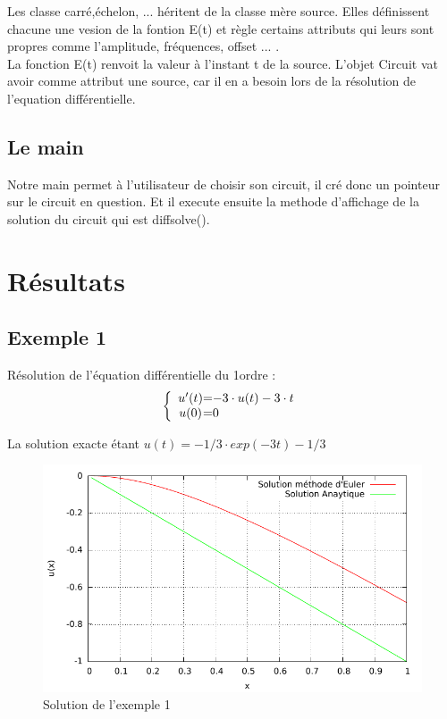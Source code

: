 \documentclass[a4paper,11pt]{article}
\begin{document}
Les classe carré,échelon, ... héritent de la classe mère source. Elles définissent chacune une vesion de la fontion E(t) et règle certains
attributs qui leurs sont propres comme l'amplitude, fréquences, offset ... .\\
La fonction E(t) renvoit la valeur à l'instant t de la source. L'objet Circuit vat avoir comme attribut une source, car il en a besoin 
lors de la résolution de l'equation différentielle.
\subsection{Le main}
Notre main permet à l'utilisateur de choisir son circuit, il cré donc un pointeur sur le circuit en question. Et il execute ensuite la methode d'affichage de la solution du 
circuit qui est diffsolve().
\newpage

\section{Résultats}
  \subsection{Exemple 1}
Résolution de l'équation différentielle du 1\ier ordre :
\begin{equation*}
 \left \{
  \begin{array}{c @{=} l}
    u'(t) & -3\cdot u(t)-3\cdot t
\\
   u(0) & 0
  \end{array}
\right.
\end{equation*} 

La solution exacte étant $u(t)=-1/3\cdot exp(-3t)-1/3$
  \begin{figure}[H]
	 \begin{center}
	\includegraphics[scale=.8]{exemple1}
	\caption{Solution de l'exemple 1}
	\end{center}
      \end{figure}
\end{document}

